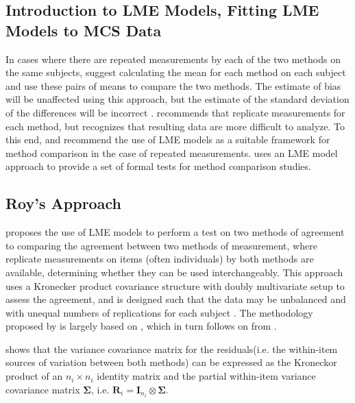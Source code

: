 \documentclass[12pt, a4paper]{report}
\theoremstyle{plain}
\theoremstyle{definition}
\theoremstyle{remark}
\begin{document}
\subsection{Introduction to LME Models, Fitting LME Models to MCS Data}
	
	In cases where there are repeated measurements by each of the two methods on the same subjects, \citet{BA99} suggest calculating
	the mean for each method on each subject and use these pairs of means to compare the two methods. The estimate of bias will be unaffected using this approach, but the estimate of the standard deviation of the differences will be incorrect \citep{BXC2004}. \citet{BXC2004} recommends that replicate measurements for each method, but recognizes that resulting data are more difficult to analyze. To this end, \citet{BXC2004} and \citet{BXC2008} recommend the use of LME models as a suitable framework for method comparison in the case of repeated measurements.
	\citet{ARoy2009} uses an LME model approach to provide a set of formal tests for method comparison studies.
	
	
	
	
	

	\subsection{Roy's Approach}
	\citet{ARoy2009} proposes the use of LME models to perform a test on two methods of agreement to comparing the agreement between two methods of measurement, where replicate measurements on items (often individuals) by both methods are available, determining whether they can be used
	interchangeably. This approach uses a Kronecker product covariance structure with doubly multivariate setup to
	assess the agreement, and is designed such that the data may be unbalanced and with unequal numbers of replications for each subject \citep{ARoy2009}.
	The methodology proposed by \citet{ARoy2009} is largely based on \citet{hamlett}, which in turn follows on from \citet{lam}.
	
		\citet{hamlett} shows that the variance covariance matrix for the residuals(i.e. the within-item sources of variation between both methods) can be expressed as the Kroneckor product of an $n_i \times n_i$ identity matrix and the partial within-item variance covariance matrix $\boldsymbol{\Sigma}$, i.e. $\boldsymbol{R}_{i} = \boldsymbol{I}_{n_{i}} \otimes \boldsymbol{\Sigma}$.
		
\end{document}
